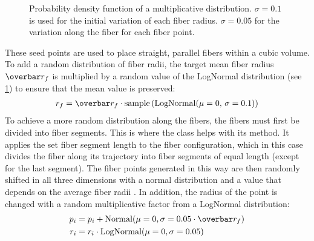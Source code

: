 \begin{figure}[!t]
\centering
\caption[]{Probability density function of a multiplicative  distribution. $\sigma=0.1$ is used for the initial variation of each fiber radius. $\sigma=0.05$ for the variation along the fiber for each fiber point.}
\label{fig:logNormal}
\end{figure}
%
These seed points are used to place straight, parallel fibers within a cubic volume.
To add a random distribution of fiber radii, the target mean fiber radius $\fiberRadiusMean$ is multiplied by a random value of the LogNormal distribution (see \cref{fig:logNormal}) to ensure that the mean value is preserved:
\begin{align}
\fiberRadius = \fiberRadiusMean \cdot \mathrm{sample}\left(\mathrm{LogNormal}(\mu=0, \, \sigma=0.1)\right)
\end{align}
%
To achieve a more random distribution along the fibers, the fibers must first be divided into fiber segments.
This is where the  class helps with its  method.
It applies the set fiber segment length to the fiber configuration, which in this case divides the fiber along its trajectory into fiber segments of equal length (except for the last segment).
The fiber points generated in this way are then randomly shifted in all three dimensions with a normal distribution and a value that depends on the average fiber radii \fiberRadiusMean{}.
In addition, the radius of the point is changed with a random multiplicative factor from a LogNormal distribution:
%
\begin{align}
\begin{split}
p_i &= p_i + \mathrm{Normal}(\mu=0,\sigma=0.05 \cdot \fiberRadiusMean)\\
r_i &= r_i \cdot \mathrm{LogNormal}(\mu=0,\sigma=0.05)
\end{split}
\end{align}
%
%
%
